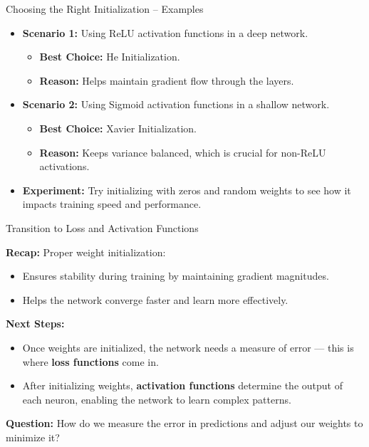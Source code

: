 \documentclass[serif, aspectratio=169]{beamer}
\begin{document}
\begin{frame}{Choosing the Right Initialization – Examples}

    \begin{itemize}
        \item \textbf{Scenario 1:} Using ReLU activation functions in a deep network.
        \begin{itemize}
            \item \textbf{Best Choice:} He Initialization.
            \item \textbf{Reason:} Helps maintain gradient flow through the layers.
        \end{itemize}
        
        \item \textbf{Scenario 2:} Using Sigmoid activation functions in a shallow network.
        \begin{itemize}
            \item \textbf{Best Choice:} Xavier Initialization.
            \item \textbf{Reason:} Keeps variance balanced, which is crucial for non-ReLU activations.
        \end{itemize}
        
        \item \textbf{Experiment:} Try initializing with zeros and random weights to see how it impacts training speed and performance.
    \end{itemize}
    
\end{frame}

\begin{frame}{Transition to Loss and Activation Functions}

    \textbf{Recap:} Proper weight initialization:
    \begin{itemize}
        \item Ensures stability during training by maintaining gradient magnitudes.
        \item Helps the network converge faster and learn more effectively.
    \end{itemize}
    
    \textbf{Next Steps:}
    \begin{itemize}
        \item Once weights are initialized, the network needs a measure of error — this is where \textbf{loss functions} come in.
        \item After initializing weights, \textbf{activation functions} determine the output of each neuron, enabling the network to learn complex patterns.
    \end{itemize}
    
    \textbf{Question:} How do we measure the error in predictions and adjust our weights to minimize it?
    
\end{frame}
\end{document}
